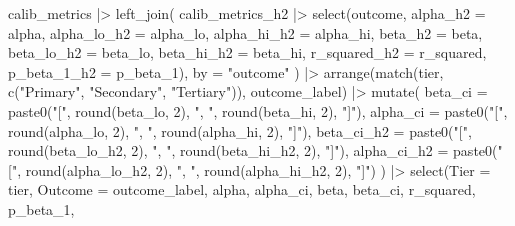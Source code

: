 \documentclass[
  letterpaper,
  DIV=11,
  numbers=noendperiod]{scrartcl}
\newenvironment{Shaded}{\begin{snugshade}}{\end{snugshade}}
\newcommand{\AttributeTok}[1]{\textcolor[rgb]{0.40,0.45,0.13}{#1}}
\newcommand{\DecValTok}[1]{\textcolor[rgb]{0.68,0.00,0.00}{#1}}
\newcommand{\FunctionTok}[1]{\textcolor[rgb]{0.28,0.35,0.67}{#1}}
\newcommand{\NormalTok}[1]{\textcolor[rgb]{0.00,0.23,0.31}{#1}}
\newcommand{\SpecialCharTok}[1]{\textcolor[rgb]{0.37,0.37,0.37}{#1}}
\newcommand{\StringTok}[1]{\textcolor[rgb]{0.13,0.47,0.30}{#1}}
\begin{document}
\begin{Shaded}
\begin{Highlighting}[]
\NormalTok{calib\_metrics }\SpecialCharTok{|\textgreater{}}
  \FunctionTok{left\_join}\NormalTok{(}
\NormalTok{    calib\_metrics\_h2 }\SpecialCharTok{|\textgreater{}}
      \FunctionTok{select}\NormalTok{(outcome,}
             \AttributeTok{alpha\_h2 =}\NormalTok{ alpha, }\AttributeTok{alpha\_lo\_h2 =}\NormalTok{ alpha\_lo, }\AttributeTok{alpha\_hi\_h2 =}\NormalTok{ alpha\_hi,}
             \AttributeTok{beta\_h2  =}\NormalTok{ beta,  }\AttributeTok{beta\_lo\_h2  =}\NormalTok{ beta\_lo,  }\AttributeTok{beta\_hi\_h2  =}\NormalTok{ beta\_hi,}
             \AttributeTok{r\_squared\_h2 =}\NormalTok{ r\_squared, }\AttributeTok{p\_beta\_1\_h2 =}\NormalTok{ p\_beta\_1),}
    \AttributeTok{by =} \StringTok{"outcome"}
\NormalTok{  ) }\SpecialCharTok{|\textgreater{}}
  \FunctionTok{arrange}\NormalTok{(}\FunctionTok{match}\NormalTok{(tier, }\FunctionTok{c}\NormalTok{(}\StringTok{"Primary"}\NormalTok{, }\StringTok{"Secondary"}\NormalTok{, }\StringTok{"Tertiary"}\NormalTok{)), outcome\_label) }\SpecialCharTok{|\textgreater{}}
  \FunctionTok{mutate}\NormalTok{(}
    \AttributeTok{beta\_ci      =} \FunctionTok{paste0}\NormalTok{(}\StringTok{"["}\NormalTok{, }\FunctionTok{round}\NormalTok{(beta\_lo,     }\DecValTok{2}\NormalTok{), }\StringTok{", "}\NormalTok{, }\FunctionTok{round}\NormalTok{(beta\_hi,     }\DecValTok{2}\NormalTok{), }\StringTok{"]"}\NormalTok{),}
    \AttributeTok{alpha\_ci     =} \FunctionTok{paste0}\NormalTok{(}\StringTok{"["}\NormalTok{, }\FunctionTok{round}\NormalTok{(alpha\_lo,    }\DecValTok{2}\NormalTok{), }\StringTok{", "}\NormalTok{, }\FunctionTok{round}\NormalTok{(alpha\_hi,    }\DecValTok{2}\NormalTok{), }\StringTok{"]"}\NormalTok{),}
    \AttributeTok{beta\_ci\_h2   =} \FunctionTok{paste0}\NormalTok{(}\StringTok{"["}\NormalTok{, }\FunctionTok{round}\NormalTok{(beta\_lo\_h2,  }\DecValTok{2}\NormalTok{), }\StringTok{", "}\NormalTok{, }\FunctionTok{round}\NormalTok{(beta\_hi\_h2,  }\DecValTok{2}\NormalTok{), }\StringTok{"]"}\NormalTok{),}
    \AttributeTok{alpha\_ci\_h2  =} \FunctionTok{paste0}\NormalTok{(}\StringTok{"["}\NormalTok{, }\FunctionTok{round}\NormalTok{(alpha\_lo\_h2, }\DecValTok{2}\NormalTok{), }\StringTok{", "}\NormalTok{, }\FunctionTok{round}\NormalTok{(alpha\_hi\_h2, }\DecValTok{2}\NormalTok{), }\StringTok{"]"}\NormalTok{)}
\NormalTok{  ) }\SpecialCharTok{|\textgreater{}}
  \FunctionTok{select}\NormalTok{(}\AttributeTok{Tier =}\NormalTok{ tier, }\AttributeTok{Outcome =}\NormalTok{ outcome\_label,}
\NormalTok{         alpha, alpha\_ci, beta, beta\_ci, r\_squared, p\_beta\_1,}

\end{Highlighting}
\end{Shaded}
\end{document}
